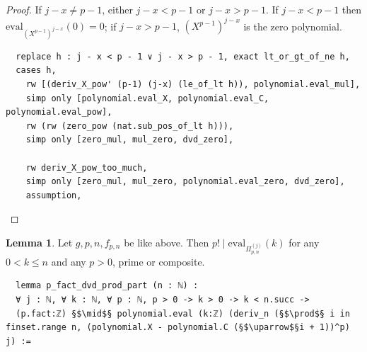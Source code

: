 \documentclass{report}
\theoremstyle{definition}
\newtheorem{lemma}{Lemma}[section]
\begin{document}
\begin{proof}
If $j-x\ne p-1$, either $j-x<p-1$ or $j-x > p-1$. If $j-x<p-1$ then $\mathrm{eval}_{(X^{p-1})^{j-x}}(0)=0$; if $j-x>p-1$, $(X^{p-1})^{j-x}$ is the zero polynomial.

\begin{verbatim}
  replace h : j - x < p - 1 ∨ j - x > p - 1, exact lt_or_gt_of_ne h,
  cases h,
    rw [(deriv_X_pow' (p-1) (j-x) (le_of_lt h)), polynomial.eval_mul], 
    simp only [polynomial.eval_X, polynomial.eval_C, polynomial.eval_pow], 
    rw (rw (zero_pow (nat.sub_pos_of_lt h))),
    simp only [zero_mul, mul_zero, dvd_zero],

    rw deriv_X_pow_too_much,
    simp only [zero_mul, mul_zero, polynomial.eval_zero, dvd_zero], 
    assumption,
\end{verbatim}
\end{proof}

\begin{lemma}\label{e:lemma_prod_part}
Let $g,p,n,f_{p,n}$ be like above. Then $p!\mid\mathrm{eval}_{\Pi_{p,n}^{(j)}}(k)$ for any $0<k\le n$ and any $p>0$, prime or composite.

\begin{verbatim}
  lemma p_fact_dvd_prod_part (n : ℕ) : 
  ∀ j : ℕ, ∀ k : ℕ, ∀ p : ℕ, p > 0 -> k > 0 -> k < n.succ ->
  (p.fact:ℤ) §$\mid$§ polynomial.eval (k:ℤ) (deriv_n (§$\prod$§ i in finset.range n, (polynomial.X - polynomial.C (§$\uparrow$§i + 1))^p) j) :=
\end{verbatim}
\end{lemma}
\end{document}
